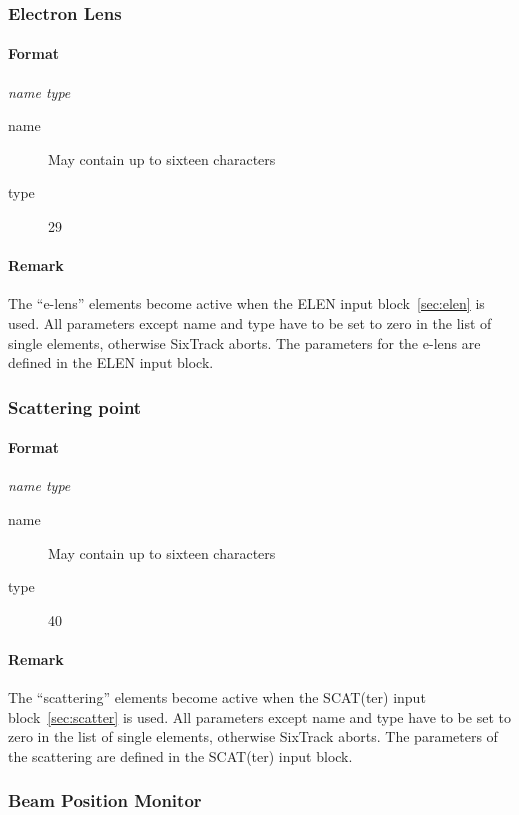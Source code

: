 \subsubsection{Electron Lens} \label{ELEN}

\paragraph{Format} {\em name type}
\begin{description}
	\item [name] May contain up to sixteen characters
	\item [type] 29
\end{description}

\paragraph{Remark}
The ``e-lens'' elements become active when the
ELEN input block~\ref{sec:elen} is used. All parameters except name and type have to be set to zero in the list of single elements, otherwise SixTrack aborts. The parameters for the e-lens are defined in the ELEN input block.

\subsubsection{Scattering point} \label{SCAT}
\paragraph{Format} {\em name type}
\begin{description}
	\item [name] May contain up to sixteen characters
	\item [type] 40
\end{description}

\paragraph{Remark}
The ``scattering'' elements become active when the SCAT(ter) input block~\ref{sec:scatter} is used.
All parameters except name and type have to be set to zero in the list of single elements, otherwise SixTrack aborts.
The parameters of the scattering are defined in the SCAT(ter) input block.


\subsubsection{Beam Position Monitor} \label{BPM}
